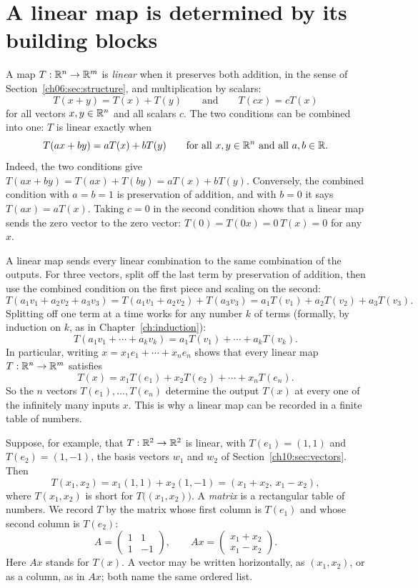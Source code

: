 \section{A linear map is determined by its building blocks}\label{ch10:sec:linearmaps}
A map $T:\mathbb R^n\to\mathbb R^m$ is \emph{linear} when it preserves both addition, in the sense of Section~\ref{ch06:sec:structure}, and multiplication by scalars:
\[
T(x+y)=T(x)+T(y)\qquad\text{and}\qquad T(cx)=cT(x)
\]
for all vectors $x,y\in\mathbb R^n$ and all scalars $c$. The two conditions can be combined into one: $T$ is linear exactly when
\[
T(ax+by)=aT(x)+bT(y)\qquad\text{for all $x,y\in\mathbb R^n$ and all $a,b\in\mathbb R$.}
\]
Indeed, the two conditions give $T(ax+by)=T(ax)+T(by)=aT(x)+bT(y)$. Conversely, the combined condition with $a=b=1$ is preservation of addition, and with $b=0$ it says $T(ax)=aT(x)$. Taking $c=0$ in the second condition shows that a linear map sends the zero vector to the zero vector: $T(0)=T(0x)=0\,T(x)=0$ for any $x$.

A linear map sends every linear combination to the same combination of the outputs. For three vectors, split off the last term by preservation of addition, then use the combined condition on the first piece and scaling on the second:
\[
T(a_1v_1+a_2v_2+a_3v_3)=T(a_1v_1+a_2v_2)+T(a_3v_3)=a_1T(v_1)+a_2T(v_2)+a_3T(v_3).
\]
Splitting off one term at a time works for any number $k$ of terms (formally, by induction on $k$, as in Chapter~\ref{ch:induction}):
\[
T(a_1v_1+\cdots+a_kv_k)=a_1T(v_1)+\cdots+a_kT(v_k).
\]
In particular, writing $x=x_1e_1+\cdots+x_ne_n$ shows that every linear map $T:\mathbb R^n\to\mathbb R^m$ satisfies
\[
T(x)=x_1T(e_1)+x_2T(e_2)+\cdots+x_nT(e_n).
\]
So the $n$ vectors $T(e_1),\ldots,T(e_n)$ determine the output $T(x)$ at every one of the infinitely many inputs $x$. This is why a linear map can be recorded in a finite table of numbers.

Suppose, for example, that $T:\mathbb R^2\to\mathbb R^2$ is linear, with $T(e_1)=(1,1)$ and $T(e_2)=(1,-1)$, the basis vectors $w_1$ and $w_2$ of Section~\ref{ch10:sec:vectors}. Then
\[
T(x_1,x_2)=x_1(1,1)+x_2(1,-1)=(x_1+x_2,\,x_1-x_2),
\]
where $T(x_1,x_2)$ is short for $T\bigl((x_1,x_2)\bigr)$. A \emph{matrix} is a rectangular table of numbers. We record $T$ by the matrix whose first column is $T(e_1)$ and whose second column is $T(e_2)$:
\[
A=\begin{pmatrix}1&1\\1&-1\end{pmatrix},\qquad
Ax=\begin{pmatrix}x_1+x_2\\x_1-x_2\end{pmatrix}.
\]
Here $Ax$ stands for $T(x)$. A vector may be written horizontally, as $(x_1,x_2)$, or as a column, as in $Ax$; both name the same ordered list.

